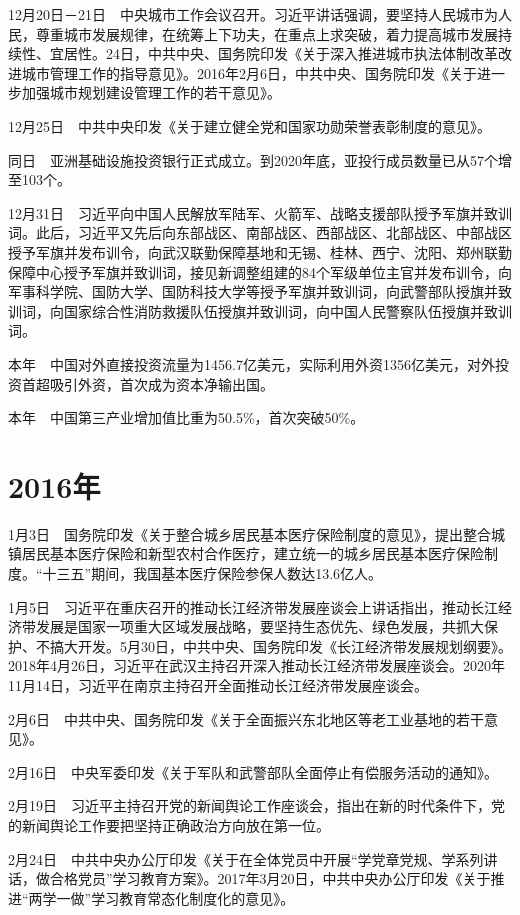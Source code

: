\documentclass[10pt,a4paper,twocolumn]{book}
\begin{document}
12月20日－21日　中央城市工作会议召开。习近平讲话强调，要坚持人民城市为人民，尊重城市发展规律，在统筹上下功夫，在重点上求突破，着力提高城市发展持续性、宜居性。24日，中共中央、国务院印发《关于深入推进城市执法体制改革改进城市管理工作的指导意见》。2016年2月6日，中共中央、国务院印发《关于进一步加强城市规划建设管理工作的若干意见》。

12月25日　中共中央印发《关于建立健全党和国家功勋荣誉表彰制度的意见》。

同日　亚洲基础设施投资银行正式成立。到2020年底，亚投行成员数量已从57个增至103个。

12月31日　习近平向中国人民解放军陆军、火箭军、战略支援部队授予军旗并致训词。此后，习近平又先后向东部战区、南部战区、西部战区、北部战区、中部战区授予军旗并发布训令，向武汉联勤保障基地和无锡、桂林、西宁、沈阳、郑州联勤保障中心授予军旗并致训词，接见新调整组建的84个军级单位主官并发布训令，向军事科学院、国防大学、国防科技大学等授予军旗并致训词，向武警部队授旗并致训词，向国家综合性消防救援队伍授旗并致训词，向中国人民警察队伍授旗并致训词。

本年　中国对外直接投资流量为1456.7亿美元，实际利用外资1356亿美元，对外投资首超吸引外资，首次成为资本净输出国。

本年　中国第三产业增加值比重为50.5\%，首次突破50\%。

\section{2016年}

1月3日　国务院印发《关于整合城乡居民基本医疗保险制度的意见》，提出整合城镇居民基本医疗保险和新型农村合作医疗，建立统一的城乡居民基本医疗保险制度。“十三五”期间，我国基本医疗保险参保人数达13.6亿人。

1月5日　习近平在重庆召开的推动长江经济带发展座谈会上讲话指出，推动长江经济带发展是国家一项重大区域发展战略，要坚持生态优先、绿色发展，共抓大保护、不搞大开发。5月30日，中共中央、国务院印发《长江经济带发展规划纲要》。2018年4月26日，习近平在武汉主持召开深入推动长江经济带发展座谈会。2020年11月14日，习近平在南京主持召开全面推动长江经济带发展座谈会。

2月6日　中共中央、国务院印发《关于全面振兴东北地区等老工业基地的若干意见》。

2月16日　中央军委印发《关于军队和武警部队全面停止有偿服务活动的通知》。

2月19日　习近平主持召开党的新闻舆论工作座谈会，指出在新的时代条件下，党的新闻舆论工作要把坚持正确政治方向放在第一位。

2月24日　中共中央办公厅印发《关于在全体党员中开展“学党章党规、学系列讲话，做合格党员”学习教育方案》。2017年3月20日，中共中央办公厅印发《关于推进“两学一做”学习教育常态化制度化的意见》。
\end{document}
